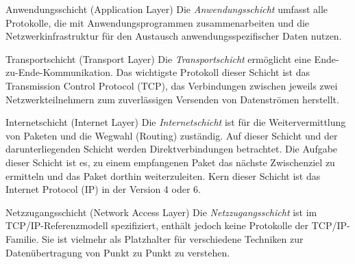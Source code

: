 \begin{defi}{Anwendungsschicht (Application Layer)}
    Die \emph{Anwendungsschicht} umfasst alle Protokolle, die mit Anwendungsprogrammen zusammenarbeiten und die Netzwerkinfrastruktur für den Austausch anwendungsspezifischer Daten nutzen.
\end{defi}

\begin{defi}{Transportschicht (Transport Layer)}
    Die \emph{Transportschicht} ermöglicht eine Ende-zu-Ende-Kommunikation. Das wichtigste Protokoll dieser Schicht ist das Transmission Control Protocol (TCP), das Verbindungen zwischen jeweils zwei Netzwerkteilnehmern zum zuverlässigen Versenden von Datenströmen herstellt.
\end{defi}

\begin{defi}{Internetschicht (Internet Layer)}
    Die \emph{Internetschicht} ist für die Weitervermittlung von Paketen und die Wegwahl (Routing) zuständig.
    Auf dieser Schicht und der darunterliegenden Schicht werden Direktverbindungen betrachtet.
    Die Aufgabe dieser Schicht ist es, zu einem empfangenen Paket das nächste Zwischenziel zu ermitteln und das Paket dorthin weiterzuleiten.
    Kern dieser Schicht ist das Internet Protocol (IP) in der Version 4 oder 6.
\end{defi}

\begin{defi}{Netzzugangsschicht (Network Access Layer)}
    Die \emph{Netzzugangsschicht} ist im TCP/IP-Referenzmodell spezifiziert, enthält jedoch keine Protokolle der TCP/IP-Familie.
    Sie ist vielmehr als Platzhalter für verschiedene Techniken zur Datenübertragung von Punkt zu Punkt zu verstehen.
\end{defi}
